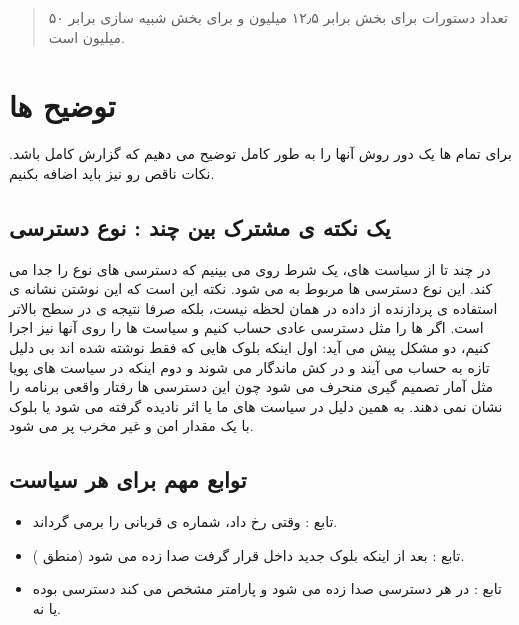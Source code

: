 \documentclass[12pt,a4paper]{article}
\begin{document}
\begin{quote}
تعداد دستورات برای بخش  برابر ۱۲٫۵ میلیون و برای بخش شبیه سازی برابر ۵۰ میلیون است.
\end{quote}

\newpage
\section{توضیح  ها}

برای تمام  ها یک دور روش آنها را به طور کامل توضیح می دهیم که گزارش کامل باشد.
نکات ناقص رو نیز باید اضافه بکنیم.

\subsection{یک نکته ی مشترک بین چند : نوع دسترسی }

در چند تا از سیاست های، یک شرط روی  می بینیم که دسترسی های نوع  را جدا می کند. این نوع دسترسی ها مربوط به  می شود. نکته این است که این نوشتن نشانه ی استفاده ی پردازنده از داده در همان لحظه نیست، بلکه صرفا نتیجه ی  در سطح بالاتر است. اگر  ها را مثل دسترسی عادی حساب کنیم و سیاست ها را روی آنها نیز اجرا کنیم، دو مشکل پیش می آید: اول اینکه بلوک هایی که فقط نوشته شده اند بی دلیل تازه به حساب می آیند و در کش ماندگار می شوند و دوم اینکه در سیاست های پویا مثل  آمار تصمیم گیری منحرف می شود چون این دسترسی ها رفتار واقعی برنامه را نشان نمی دهند. به همین دلیل در سیاست های ما یا اثر  نادیده گرفته می شود یا بلوک با یک مقدار امن و غیر مخرب پر می شود.

\subsection{توابع مهم برای هر سیاست}

\begin{itemize}
  \item تابع : وقتی  رخ داد، شماره ی  قربانی را برمی گرداند.
  \item تابع : بعد از اینکه بلوک جدید داخل  قرار گرفت صدا زده می شود (منطق ).
  \item تابع : در هر دسترسی صدا زده می شود و پارامتر  مشخص می کند دسترسی  بوده یا نه.
\end{itemize}
\end{document}
